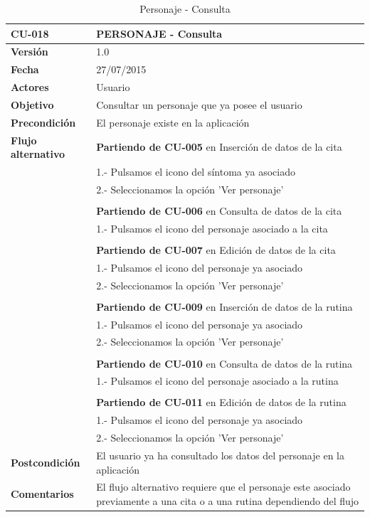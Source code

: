 \documentclass[../pfc.tex]{subfiles}
\begin{document}
		\begin{table}[H]
			\centering
			\begin{tabular}[t]{|p{3cm}|p{9.5cm}|}
				\hline \textbf{CU-018} & \textbf{PERSONAJE - Consulta} \\*
				\hline\hline \textbf{Versión} & 1.0 \\*
				\hline\hline \textbf{Fecha} & 27/07/2015 \\*
				\hline\textbf{Actores} 	& Usuario\\*
				\hline \textbf{Objetivo} & Consultar un personaje que ya posee el usuario\\* 			
				\hline \textbf{Precondición} & El personaje existe en la aplicación\\* 
				\hline \textbf{Flujo alternativo} & \textbf{Partiendo de CU-005} en Inserción de datos de la cita\\* 
				& 1.- Pulsamos el icono del síntoma ya asociado\\*	
				& 2.- Seleccionamos la opción 'Ver personaje'\\*
				& \\*
				& \textbf{Partiendo de CU-006} en Consulta de datos de la cita\\* 
				& 1.- Pulsamos el icono del personaje asociado a la cita\\*	
				& \\*
				& \textbf{Partiendo de CU-007} en Edición de datos de la cita\\* 
				& 1.- Pulsamos el icono del personaje ya asociado\\*	
				& 2.- Seleccionamos la opción 'Ver personaje'\\*
				& \\*
				& \textbf{Partiendo de CU-009} en Inserción de datos de la rutina\\* 
				& 1.- Pulsamos el icono del personaje ya asociado\\*	
				& 2.- Seleccionamos la opción 'Ver personaje'\\*
				& \\*
				& \textbf{Partiendo de CU-010} en Consulta de datos de la rutina\\* 
				& 1.- Pulsamos el icono del personaje asociado a la rutina\\*	
				& \\*
				& \textbf{Partiendo de CU-011} en Edición de datos de la rutina\\* 
				& 1.- Pulsamos el icono del personaje ya asociado\\*	
				& 2.- Seleccionamos la opción 'Ver personaje'\\*
				\hline \textbf{Postcondición} & El usuario ya ha consultado los datos del personaje en la aplicación \\* 
				\hline \textbf{Comentarios}   & El flujo alternativo requiere que el personaje este asociado previamente a una cita o a una rutina dependiendo del flujo\\*
				\hline
			\end{tabular}
			\caption{Personaje - Consulta}
			\label{tabla:caso018}
		\end{table}
		
\end{document}
